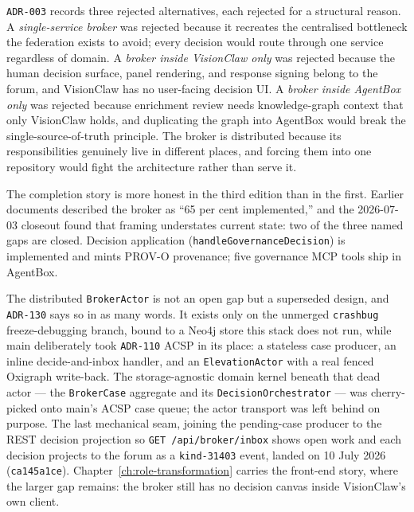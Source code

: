 \begin{keyinsight}[title={Why no single repository owns the broker}]
\texttt{ADR-003} records three rejected alternatives, each rejected for a structural reason. A \emph{single-service broker} was rejected because it recreates the centralised bottleneck the federation exists to avoid; every decision would route through one service regardless of domain. A \emph{broker inside VisionClaw only} was rejected because the human decision surface, panel rendering, and response signing belong to the forum, and VisionClaw has no user-facing decision UI. A \emph{broker inside AgentBox only} was rejected because enrichment review needs knowledge-graph context that only VisionClaw holds, and duplicating the graph into AgentBox would break the single-source-of-truth principle. The broker is distributed because its responsibilities genuinely live in different places, and forcing them into one repository would fight the architecture rather than serve it.
\end{keyinsight}

The completion story is more honest in the third edition than in the first. Earlier documents described the broker as ``65 per cent implemented,'' and the 2026-07-03 closeout found that framing understates current state: two of the three named gaps are closed. Decision application (\texttt{handleGovernanceDecision}) is implemented and mints PROV-O provenance; five governance MCP tools ship in AgentBox.

The distributed \texttt{BrokerActor} is not an open gap but a superseded design, and \texttt{ADR-130} says so in as many words. It exists only on the unmerged \texttt{crashbug} freeze-debugging branch, bound to a Neo4j store this stack does not run, while main deliberately took \texttt{ADR-110} ACSP in its place: a stateless case producer, an inline decide-and-inbox handler, and an \texttt{ElevationActor} with a real fenced Oxigraph write-back. The storage-agnostic domain kernel beneath that dead actor --- the \texttt{BrokerCase} aggregate and its \texttt{DecisionOrchestrator} --- was cherry-picked onto main's ACSP case queue; the actor transport was left behind on purpose. The last mechanical seam, joining the pending-case producer to the REST decision projection so \texttt{GET /api/broker/inbox} shows open work and each decision projects to the forum as a \texttt{kind-31403} event, landed on 10 July 2026 (\texttt{ca145a1ce}). Chapter~\ref{ch:role-transformation} carries the front-end story, where the larger gap remains: the broker still has no decision canvas inside VisionClaw's own client.

